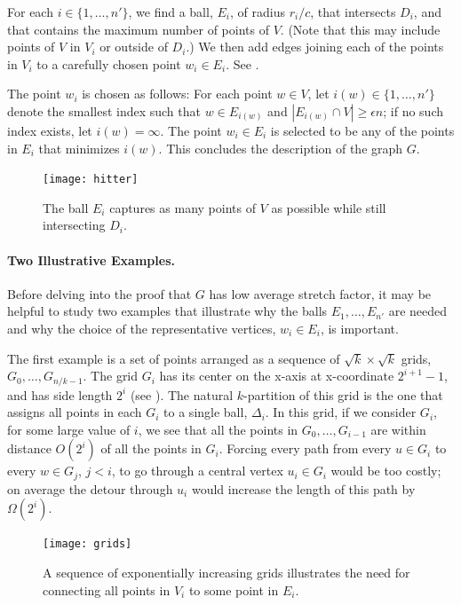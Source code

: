 \documentclass{patmorin}
\begin{document}
For each $i\in\{1,\ldots,n'\}$, we find a ball, $E_i$, of radius $r_i/c$,
that intersects $D_i$, and that contains the maximum number of points
of $V$.  (Note that this may include points of $V$ in $V_i$ or outside
of $D_i$.)  We then add edges joining each of the points in $V_i$ to
a carefully chosen point $w_i\in E_i$.  See .

The point $w_i$ is chosen as follows: For each point $w\in V$, let
$i(w)\in \{1,\ldots,n'\}$ denote the smallest index such that $w\in
E_{i(w)}$ and $|E_{i(w)}\cap V| \ge \epsilon n$; if no such index exists,
let $i(w)=\infty$.  The point $w_i\in E_i$ is selected to be any of the
points in $E_i$ that minimizes $i(w)$.  This concludes the description
of the graph $G$.


\begin{figure}
  \begin{center}
    \texttt{[image: hitter]}
  \end{center}
  \caption{The ball $E_i$ captures as many points of $V$ as possible
   while still intersecting $D_i$.}
\end{figure}

\paragraph{Two Illustrative Examples.}

Before delving into the proof that $G$ has low average stretch factor,
it may be helpful to study two examples that illustrate why the balls
$E_1,\ldots,E_{n'}$ are needed and why the choice of the representative
vertices, $w_i\in E_i$, is  important.

The first example is a set of points arranged as a sequence of
$\sqrt{k}\times\sqrt{k}$ grids, $G_0,\ldots,G_{n/k-1}$.  The grid $G_i$
has its center on the x-axis at x-coordinate $2^{i+1}-1$, and has side
length $2^i$ (see ). The natural $k$-partition of this
grid is the one that assigns all points in each $G_i$ to a single ball,
$\Delta_i$.  In this grid, if we consider $G_i$, for some large value
of $i$, we see that all the points in $G_0,\ldots,G_{i-1}$ are within
distance $O(2^{i})$ of all the points in $G_i$.  Forcing every path from
every $u\in G_i$ to every $w\in G_{j}$, $j<i$, to go through a central
vertex $u_i\in G_i$ would be too costly; on average the detour through
$u_i$ would increase the length of this path by $\Omega(2^{i})$.

\begin{figure}
  \begin{center}
    \texttt{[image: grids]}
  \end{center}
  \caption{A sequence of exponentially increasing grids illustrates the
   need for connecting all points in $V_i$ to some point in $E_i$.}
\end{figure}
\end{document}
